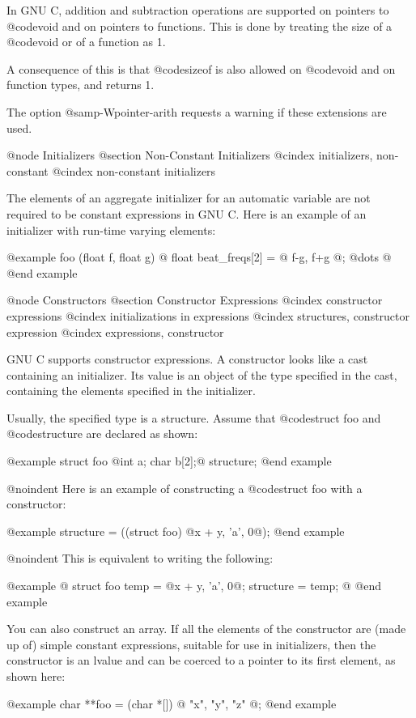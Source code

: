 {In GNU C, addition and subtraction operations are supported on pointers to
@code{void} and on pointers to functions.  This is done by treating the
size of a @code{void} or of a function as 1.

A consequence of this is that @code{sizeof} is also allowed on @code{void}
and on function types, and returns 1.

The option @samp{-Wpointer-arith} requests a warning if these extensions
are used.

@node Initializers
@section Non-Constant Initializers
@cindex initializers, non-constant
@cindex non-constant initializers

The elements of an aggregate initializer for an automatic variable are
not required to be constant expressions in GNU C.  Here is an example of
an initializer with run-time varying elements:

@example
foo (float f, float g)
@{
  float beat_freqs[2] = @{ f-g, f+g @};
  @dots{}
@}
@end example

@node Constructors
@section Constructor Expressions
@cindex constructor expressions
@cindex initializations in expressions
@cindex structures, constructor expression
@cindex expressions, constructor 

GNU C supports constructor expressions.  A constructor looks like
a cast containing an initializer.  Its value is an object of the
type specified in the cast, containing the elements specified in
the initializer.

Usually, the specified type is a structure.  Assume that
@code{struct foo} and @code{structure} are declared as shown:

@example
struct foo @{int a; char b[2];@} structure;
@end example

@noindent
Here is an example of constructing a @code{struct foo} with a constructor:

@example
structure = ((struct foo) @{x + y, 'a', 0@});
@end example

@noindent
This is equivalent to writing the following:

@example
@{
  struct foo temp = @{x + y, 'a', 0@};
  structure = temp;
@}
@end example

You can also construct an array.  If all the elements of the constructor
are (made up of) simple constant expressions, suitable for use in
initializers, then the constructor is an lvalue and can be coerced to a
pointer to its first element, as shown here:

@example
char **foo = (char *[]) @{ "x", "y", "z" @};
@end example

}
